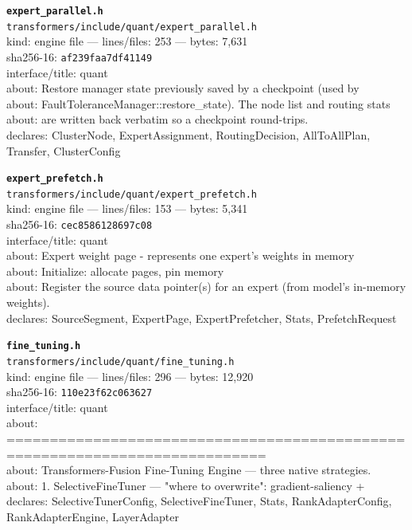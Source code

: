 \noindent\textbf{\texttt{expert\_parallel.h}}\\
\texttt{transformers/include/quant/expert\_parallel.h}\\
kind: engine file --- lines/files: 253 --- bytes: 7,631\\
sha256-16: \texttt{af239faa7df41149}\\
interface/title: quant\\
about: Restore manager state previously saved by a checkpoint (used by\\
about: FaultToleranceManager::restore\_state). The node list and routing stats\\
about: are written back verbatim so a checkpoint round-trips.\\
declares: ClusterNode, ExpertAssignment, RoutingDecision, AllToAllPlan, Transfer, ClusterConfig\\
\vspace*{6.0pt}

\noindent\textbf{\texttt{expert\_prefetch.h}}\\
\texttt{transformers/include/quant/expert\_prefetch.h}\\
kind: engine file --- lines/files: 153 --- bytes: 5,341\\
sha256-16: \texttt{cec8586128697c08}\\
interface/title: quant\\
about: Expert weight page - represents one expert's weights in memory\\
about: Initialize: allocate pages, pin memory\\
about: Register the source data pointer(s) for an expert (from model's in-memory weights).\\
declares: SourceSegment, ExpertPage, ExpertPrefetcher, Stats, PrefetchRequest\\
\vspace*{6.0pt}

\noindent\textbf{\texttt{fine\_tuning.h}}\\
\texttt{transformers/include/quant/fine\_tuning.h}\\
kind: engine file --- lines/files: 296 --- bytes: 12,920\\
sha256-16: \texttt{110e23f62c063627}\\
interface/title: quant\\
about: ============================================================================\\
about: Transformers-Fusion Fine-Tuning Engine — three native strategies.\\
about: 1. SelectiveFineTuner        — "where to overwrite": gradient-saliency +\\
declares: SelectiveTunerConfig, SelectiveFineTuner, Stats, RankAdapterConfig, RankAdapterEngine, LayerAdapter\\
\vspace*{6.0pt}

